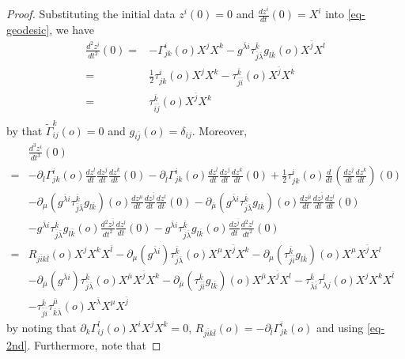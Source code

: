 \documentclass[12pt]{amsart}
\def\bk{{\bar k}}
\def\bl{{\bar l}}
\def\p{\partial}
\theoremstyle{definition}
\theoremstyle{remark}
\numberwithin{equation}{section}
\def\bi{{\bar i}}
\def\bj{{\bar j}}
\begin{document}
\begin{proof}
Substituting the initial data $z^i(0)=0$ and $\frac{dz^i}{dt}(0)=X^i$ into \eqref{eq-geodesic}, we have
\begin{equation}\label{eq-2nd}
\begin{split}
\frac{d^2z^i}{dt^2}(0)=&-\Gamma_{jk}^i(o)X^jX^k-g^{\bar \lambda i}\tau_{\bar j\bar\lambda}^\bk g_{l\bk}(o)X^{\bar j}X^l\\
=&\frac12\tau_{jk}^i(o)X^jX^k-\tau_{\bar j\bar i}^\bk(o)X^{\bar j}X^k\\
=&\tau_{\bar i\bar j}^\bk(o)X^\bj X^k\\
\end{split}
\end{equation}
by that $\tilde \Gamma_{ij}^k(o)=0$ and $g_{i\bj}(o)=\delta_{ij}$. Moreover,
\begin{equation}\label{eq-3nd-1}
\begin{split}
&\frac{d^3z^i}{dt^3}(0)\\
=&-\p_l\Gamma_{jk}^i(o)\frac{dz^l}{dt}\frac{dz^j}{dt}\frac{dz^k}{dt}(0)-\p_{\bar l}\Gamma_{jk}^i(o)\frac{dz^{\bar l}}{dt}\frac{dz^j}{dt}\frac{dz^k}{dt}(0)+\frac12\tau_{jk}^i(o)\frac{d}{dt}\left(\frac{dz^j}{dt}\frac{dz^k}{dt}\right)(0)\\
&-\p_\mu(g^{\bar \lambda i}\tau_{\bar j\bar\lambda}^\bk g_{l\bk})(o)\frac{dz^\mu}{dt}\frac{dz^{\bar j}}{dt}\frac{dz^l}{dt}(0)-\p_{\bar \mu}(g^{\bar \lambda i}\tau_{\bar j\bar\lambda}^\bk g_{l\bk})(o)\frac{dz^{\bar \mu}}{dt}\frac{dz^{\bar j}}{dt}\frac{dz^l}{dt}(0)\\
&-g^{\bar \lambda i}\tau_{\bar j\bar\lambda}^\bk g_{l\bk}(o)\frac{d^2z^{\bar j}}{dt^2}\frac{dz^l}{dt}(0)-g^{\bar \lambda i}\tau_{\bar j\bar\lambda}^\bk g_{l\bk}(o)\frac{dz^{\bar j}}{dt}\frac{d^2z^l}{dt^2}(0)\\
=&R_{j\bi k\bl}(o)X^jX^kX^{\bar l}-\p_\mu(g^{\bar \lambda i})\tau_{\bar j\bar\lambda}^\bk (o)X^\mu X^{\bar j}X^k-\p_\mu(\tau_{\bar j\bi}^\bk g_{l\bk})(o)X^\mu X^{\bar j}X^l\\
&-\p_{\bar \mu}(g^{\bar \lambda i})\tau_{\bar j\bar\lambda}^\bk(o)X^{\bar\mu}X^{\bar j}X^k-\p_{\bar \mu}(\tau_{\bar j\bi}^\bk g_{l\bk})(o)X^{\bar\mu}X^{\bar j}X^l-\tau_{\bar \lambda \bi}^\bk\tau_{\lambda j}^l(o) X^j X^k X^{\bar l}\\
&-\tau_{\bar j\bi}^\bk\tau_{\bar k\bar\lambda}^{\bar \mu}(o)X^{\bar\lambda}X^\mu X^{\bar j}
\end{split}
\end{equation}
by noting that $\p_k\Gamma_{ij}^l(o)X^iX^jX^k=0$, $R_{j\bi k\bl}(o)=-\p_{\bar l}\Gamma_{jk}^i(o)$ and using \eqref{eq-2nd}. Furthermore, note that

\end{proof}
\end{document}
